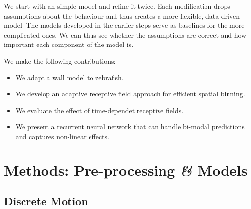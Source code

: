 \documentclass[nobib]{tufte-handout}
\begin{document}
We start with an simple model and refine it twice.
Each modification drops assumptions about the behaviour and thus creates a more flexible, data-driven model.
The models developed in the earlier steps serve as baselines for the more complicated ones.
We can thus see whether the assumptions are correct and how important each component of the model is.

We make the following contributions:
\begin{itemize}
\item We adapt a wall model to zebrafish.
\item We develop an adaptive receptive field approach for efficient spatial binning.
\item We evaluate the effect of time-dependet receptive fields.
\item We present a recurrent neural network that can handle bi-modal predictions and captures non-linear effects.

\end{itemize}
\section{Methods: Pre-processing \textit{\&} Models}

\subsection{Discrete Motion}
\end{document}
